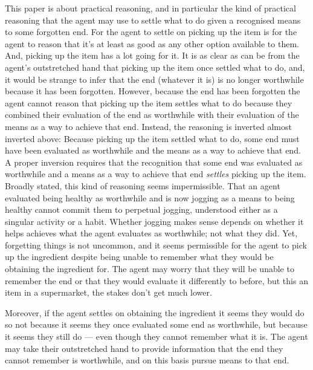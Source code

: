 \documentclass[10pt]{article}
\begin{document}
This paper is about practical reasoning, and in particular the kind of practical reasoning that the agent may use to settle what to do given a recognised means to some forgotten end.
For the agent to settle on picking up the item is for the agent to reason that it's at least as good as any other option available to them.
And, picking up the item has a lot going for it.
It is as clear as can be from the agent's outstretched hand that picking up the item once settled what to do, and, it would be strange to infer that the end (whatever it is) is no longer worthwhile because it has been forgotten.
However, because the end has been forgotten the agent cannot reason that picking up the item settles what to do because they combined their evaluation of the end as worthwhile with their evaluation of the means as a way to achieve that end.
Instead, the reasoning is inverted almost inverted above:
Because picking up the item settled what to do, some end must have been evaluated as worthwhile and the means as a way to achieve that end.
A proper inversion requires that the recognition that some end was evaluated as worthwhile and a means as a way to achieve that end \emph{settles} picking up the item.
Broadly stated, this kind of reasoning seems impermissible.
That an agent evaluated being healthy as worthwhile and is now jogging as a means to being healthy cannot commit them to perpetual jogging, understood either as a singular activity or a habit.
Whether jogging makes sense depends on whether it helps achieves what the agent evaluates as worthwhile; not what they did.
Yet, forgetting things is not uncommon, and it seems permissible for the agent to pick up the ingredient despite being unable to remember what they would be obtaining the ingredient for.
The agent may worry that they will be unable to remember the end or that they would evaluate it differently to before, but this an item in a supermarket, the stakes don't get much lower.

Moreover, if the agent settles on obtaining the ingredient it seems they would do so not because it seems they once evaluated some end as worthwhile, but because it seems they still do --- even though they cannot remember what it is.
The agent may take their outstretched hand to provide information that the end they cannot remember is worthwhile, and on this basis pursue means to that end.
\end{document}
